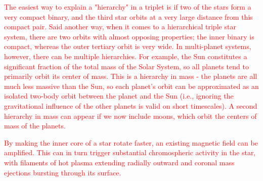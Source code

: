 \documentclass[main.tex]{subfiles}
\begin{document}
\begin{tcolorbox}[sharp corners, colback=red!30, colframe=red!80!blue, title=Orbital Hierarchies$^{18}$]
\par \textcolor{red} {The easiest way to explain a "hierarchy" in a triplet is if two of the stars form a very compact binary, and the third star orbits at a very large distance from this compact pair.  
Said another way, when it comes to a hierarchical triple star system, there are two orbits with almost opposing properties; the inner binary is compact, whereas the outer tertiary orbit is very wide.  In multi-planet systems, however, there can be multiple hierarchies.  For example, the Sun constitutes a significant fraction of the total mass of the Solar System, so all planets tend to primarily orbit its center of mass.  This is a hierarchy in mass - the planets are all much less massive than the Sun, so each planet's orbit can be approximated as an isolated two-body orbit between the planet and the Sun (i.e., ignoring the gravitational influence of the other planets is valid on short timescales). A second hierarchy in mass can appear if we now include moons, which orbit the centers of mass of the planets.}
\end{tcolorbox}

\begin{tcolorbox}[sharp corners, colback=red!30, colframe=red!80!blue, title=Magnetic Fields and Dynamos$^{19}$]
\par \textcolor{red} {By making the inner core of a star rotate faster, an existing magnetic field can be amplified.   This can in turn trigger substantial chromospheric activity in the star, with filaments of hot plasma extending radially outward and coronal mass ejections bursting through its surface.}  
\end{tcolorbox}
\end{document}
